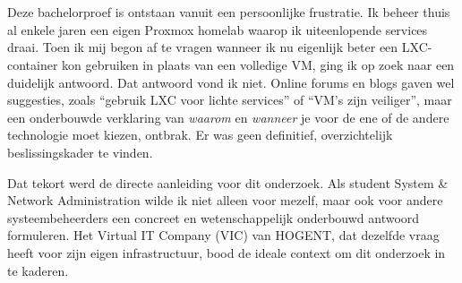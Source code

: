 
\chapter*{}%
\label{ch:voorwoord}

Deze bachelorproef is ontstaan vanuit een persoonlijke frustratie. Ik beheer thuis al enkele jaren een eigen Proxmox homelab waarop ik uiteenlopende services draai. Toen ik mij begon af te vragen wanneer ik nu eigenlijk beter een LXC-container kon gebruiken in plaats van een volledige VM, ging ik op zoek naar een duidelijk antwoord. Dat antwoord vond ik niet. Online forums en blogs gaven wel suggesties, zoals ``gebruik LXC voor lichte services'' of ``VM's zijn veiliger'', maar een onderbouwde verklaring van \textit{waarom} en \textit{wanneer} je voor de ene of de andere technologie moet kiezen, ontbrak. Er was geen definitief, overzichtelijk beslissingskader te vinden.

Dat tekort werd de directe aanleiding voor dit onderzoek. Als student System \& Network Administration wilde ik niet alleen voor mezelf, maar ook voor andere systeembeheerders een concreet en wetenschappelijk onderbouwd antwoord formuleren. Het Virtual IT Company (VIC) van HOGENT, dat dezelfde vraag heeft voor zijn eigen infrastructuur, bood de ideale context om dit onderzoek in te kaderen.
